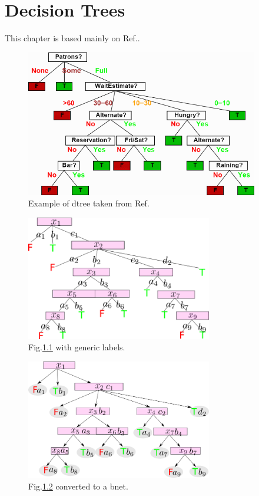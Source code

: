 \chapter{Decision Trees}\label{ch-dtree}
This chapter is based 
mainly on Ref.\cite{stu-nor-book}.

\begin{figure}[h!]
\centering
\includegraphics[width=4in]
{dtree/dtree-waiting.png}
\caption{Example of dtree taken from Ref.\cite{stu-nor-book}} 
\label{fig-dtree-waiting}
\end{figure}


\begin{figure}[h!]
\centering
\includegraphics[width=3.2in]
{dtree/dtree-waiting-labels.png}
\caption{Fig.\ref{fig-dtree-waiting} with
generic labels.} 
\label{fig-dtree-waiting-labels}
\end{figure}

\begin{figure}[h!]
\centering
\includegraphics[width=3.2in]
{dtree/dtree-waiting-dags.png}
\caption{Fig.\ref{fig-dtree-waiting-labels}
converted to a bnet.} 
\label{fig-dtree-waiting-dags}
\end{figure}

